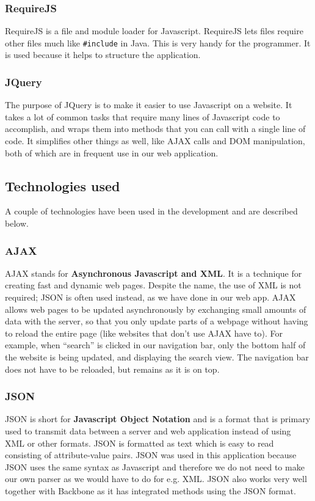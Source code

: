 \subsubsection{RequireJS}
RequireJS\cite{web_5} is a file and module loader for Javascript. RequireJS lets files require other files much like \texttt{\#include} in Java. This is very handy for the programmer. It is used because it helps to structure the application.
\subsubsection{JQuery}
The purpose of JQuery\cite{web_6} is to make it easier to use Javascript on a website. It takes a lot of common tasks that require many lines of Javascript code to accomplish, and wraps them into methods that you can call with a single line of code. It simplifies other things as well, like AJAX calls and DOM manipulation, both of which are in frequent use in our web application.


\subsection{Technologies used}
A couple of technologies have been used in the development and are described below.

\subsubsection{AJAX}
AJAX\cite{web_3} stands for \textbf{Asynchronous Javascript and XML}. It is a technique for creating fast and dynamic web pages. Despite the name, the use of XML is not required; JSON is often used instead, as we have done in our web app. AJAX allows web pages to be updated asynchronously by exchanging small amounts of data with the server, so that you only update parts of a webpage without having to reload the entire page (like websites that don’t use AJAX have to). For example, when “search” is clicked in our navigation bar, only the bottom half of the website is being updated, and displaying the search view. The navigation bar does not have to be reloaded, but remains as it is on top.

\subsubsection{JSON}
JSON\cite{web_4} is short for \textbf{Javascript Object Notation} and is a format that is primary used to transmit data between a server and web application instead of using XML or other formats.
JSON is formatted as text which is easy to read consisting of attribute-value pairs.
JSON was used in this application because JSON uses the same syntax as Javascript and therefore we do not need to make our own parser as we would have to do for e.g. XML. JSON also works very well together with Backbone as it has integrated methods using the JSON format.

